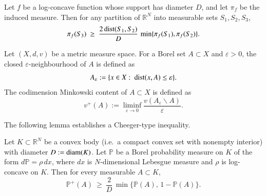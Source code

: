 \documentclass[12pt]{amsart}
\begin{document}
\begin{proposition}{\rm \cite[Theorem 4.2]{VempalaSurvey}}\label{prop:KLS-N}
Let $f$ be a log-concave function whose support has diameter $D$, and let $\pi_f$ be the induced measure.
Then for any partition of $\mathbb{R}^N$ into measurable sets $S_1,S_2,S_3$,
\[
\pi_f(S_3)\ \ge\ \frac{2\,{\rm dist}(S_1,S_2)}{D}\,\min\{\pi_f(S_1),\pi_f(S_2)\}.
\]
\end{proposition}

\begin{definition}\label{def:minkowski-N}
Let $(X,d,v)$ be a metric measure space. For a Borel set $A\subset X$ and $\varepsilon>0$, the closed $\varepsilon$-neighbourhood of $A$ is defined as
\[A_\varepsilon:=\{x\in X:\ {\rm dist}(x,A)\leq\varepsilon\}.\]
The codimension Minkowski content of $A\subset X$ is defined as
\[
v^{+}(A):=\liminf_{\varepsilon\rightarrow 0}\frac{v(A_\varepsilon\backslash A)}{\varepsilon}.
\]
\end{definition}

The following lemma establishes a Cheeger-type inequality.
\begin{lemma}\label{lem:cheeger-N}
Let $K\subset\mathbb{R}^N$ be a convex body (i.e.\ a compact convex set with nonempty interior) with diameter $D:={\rm diam}(K)$.
Let $\mathbb{P}$ be a Borel probability measure on $K$ of the form $d\mathbb{P}=\rho\,dx$, where $dx$ is $N$-dimensional
Lebesgue measure and $\rho$ is log-concave on $K$. Then for every measurable $A\subset K$,
\[
\mathbb{P}^+(A)\ \ge\ \frac{2}{D}\,\min\{\mathbb{P}(A),\,1-\mathbb{P}(A)\}.
\]
\end{lemma}
\end{document}
